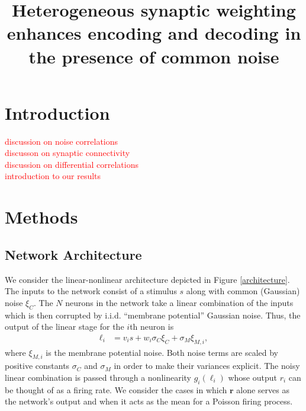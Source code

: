 \documentclass[11pt]{article}
\title{Heterogeneous synaptic weighting enhances encoding and decoding in the presence of common noise}
\date{}
\begin{document}
	\maketitle
	
	\section{Introduction}
	\textcolor{red}{discussion on noise correlations} \\
	\textcolor{red}{discusson on synaptic connectivity} \\
	\textcolor{red}{discussion on differential correlations} \\
	\textcolor{red}{introduction to our results}
	
	\newpage 
	
	\section{Methods}
	\subsection{Network Architecture}
	We consider the linear-nonlinear architecture depicted in Figure \ref{architecture}. The inputs to the network consist of a stimulus $s$ along with common (Gaussian) noise $\xi_C$. The $N$ neurons in the network take a linear combination of the inputs which is then corrupted by i.i.d. ``membrane potential'' Gaussian noise. Thus, the output of the linear stage for the $i$th neuron is 
	\begin{align}
		\ell_i &= v_i s + w_i \sigma_C \xi_C + \sigma_M\xi_{M,i},
	\end{align}
	where $\xi_{M,i}$ is the membrane potential noise. Both noise terms are scaled by positive constants $\sigma_C$ and $\sigma_M$ in order to make their variances explicit. The noisy linear combination is passed through a nonlinearity $g_i(\ell_i)$ whose output $r_i$ can be thought of as a firing rate. We consider the cases in which $\mathbf{r}$ alone serves as the network's output and when it acts as the mean for a Poisson firing process.
	
\end{document}
